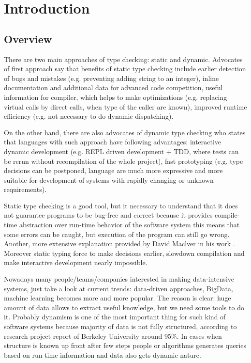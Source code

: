 \chapter{Introduction}
\label{chap:intro}

\section{Overview}

There are two main approaches of type checking: static and dynamic. Advocates of
first approach say that benefits of static type checking include earlier
detection of bugs and mistakes (e.g. preventing adding string to an integer),
inline documentation and additional data for advanced code competition, useful
information for compiler, which helps to make optimizations (e.g. replacing
virtual calls by direct calls, when type of the caller are known), improved
runtime efficiency (e.g. not necessary to do dynamic dispatching).

On the other hand, there are also advocates of dynamic type checking who states
that languages with such approach have following advantages: interactive dynamic
development (e.g. REPL driven development + TDD, where tests can be rerun
without recompilation of the whole project), fast prototyping (e.g. type
decisions can be postponed, language are much more expressive and more suitable
for development of systems with rapidly changing or unknown requirements).

Static type checking is a good tool, but it necessary to understand that it
does not guarantee programs to be bug-free and correct because it provides
compile-time abstraction over run-time behavior of the software system this
means that some errors can be caught, but execution of the program can still go
wrong. Another, more extensive explanation provided by David Maclver in his work
\cite{staticbroken}. Moreover static typing force to make decisions earlier,
slowdown compilation and make interactive development nearly impossible.

Nowadays many people/teams/companies interested in making data-intensive
systems, just take a look at current trends: data-driven approaches, BigData,
machine learning becomes more and more popular. The reason is clear: huge amount
of data allows to extract useful knowledge, but we need some tools to do it.
Probably dynamism is one of the most important thing for such kind of software
systems because majority of data is not fully structured, according to research
project report of Berkeley University \cite{lymanmuch} around 95\%. In cases when
structure is known up front after few steps people or algorithms generates
queries based on run-time information and data also gets dynamic nature.

